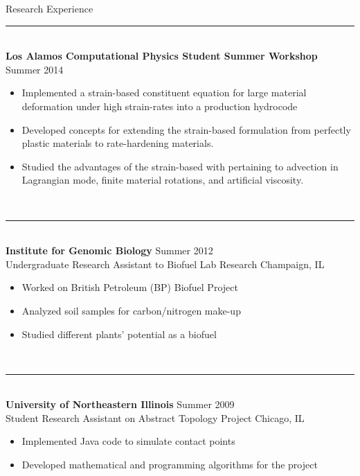 \documentclass{resume} %
\begin{document}
\begin{rSection}{Research Experience}
	{\centering\noindent\rule{5cm}{0.4pt}}
	\\
	{\bf Los Alamos Computational Physics Student Summer Workshop} \hfill {Summer 2014}
	\begin{itemize}
	\item Implemented a strain-based constituent equation for large material deformation under high strain-rates into a production hydrocode
	\item Developed concepts for extending the strain-based formulation from perfectly plastic materials to rate-hardening materials.
	\item Studied the advantages of the strain-based with pertaining to advection in Lagrangian mode, finite material rotations, and artificial viscosity.
	\end{itemize}
	\\
	{\centering\noindent\rule{5cm}{0.4pt}}
	\\
	{\bf Institute for Genomic Biology} \hfill {Summer 2012}\\
	Undergraduate Research Assistant to Biofuel Lab Research \hfill {Champaign, IL}
	\begin{itemize}
	\item Worked on British Petroleum (BP) Biofuel Project
	\item Analyzed soil samples for carbon/nitrogen make-up
	\item Studied different plants' potential as a biofuel
	\end{itemize}
	\\
	{\centering\noindent\rule{5cm}{0.4pt}}
	\\
	{\bf University of Northeastern Illinois} \hfill {Summer 2009}\\
	Student Research Assistant on Abstract Topology Project \hfill {Chicago, IL}
	\begin{itemize}
	\item Implemented Java code to simulate contact points
	\item Developed mathematical and programming algorithms for the project
	\end{itemize} \\
	
\end{rSection}



\end{document}
